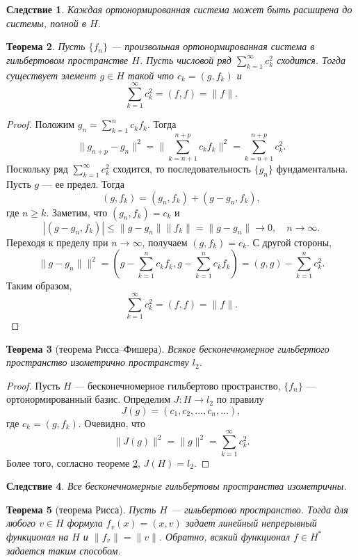 \documentclass[12pt, titlepage, oneside]{amsbook}
\newtheorem{theorem}{Теорема}[chapter]
\newtheorem{corollary}[theorem]{Следствие}
\theoremstyle{definition}
\theoremstyle{remark}
\begin{document}
\begin{corollary}
	\label{Hil4}
	Каждая ортонормированная система может быть расширена до системы, полной в $H$.
\end{corollary}

\begin{theorem}
	\label{Hil5}
	Пусть $\{f_n\}$ --- произвольная ортонормированная система в гильбертовом пространстве $H$. Пусть числовой ряд $\sum\limits_{k=1}^{\infty}c^2_k$ сходится. Тогда существует элемент $g\in H$ такой что $c_k=(g,f_k)$ и $$\sum\limits_{k=1}^{\infty}c^2_k=(f,f)=\|f\|.$$
\end{theorem}

\begin{proof}
	Положим $g_n=\sum\limits_{k=1}^{n}c_k f_k$. Тогда $$\|g_{n+p}-g_{n}\|^2=\|\sum\limits_{k=n+1}^{n+p}c_k f_k\|^2=\sum\limits_{k=n+1}^{n+p}c^2_k.$$ Поскольку ряд $\sum\limits_{k=1}^{\infty}c^2_k$ сходится, то последовательность $\{g_n\}$ фундаментальна. Пусть $g$ --- ее предел. Тогда $$(g,f_k)=(g_n,f_k)+(g-g_n,f_k),$$ где $n\geq k$. Заметим, что $(g_n,f_k)=c_k$ и $$|(g-g_n,f_k)|\leq\|g-g_n\|\|f_k\|=\|g-g_n\|\rightarrow 0,\quad n\rightarrow\infty.$$ Переходя к пределу при $n\rightarrow\infty$, получаем $(g,f_k)=c_k$. С другой стороны, $$\|g-g_n\|\|^2=\left(g-\sum\limits_{k=1}^{n}c_k f_k,g-\sum\limits_{k=1}^{n}c_k f_k\right)=(g,g)-\sum\limits_{k=1}^{n}c^2_k.$$ Таким образом, $$\sum\limits_{k=1}^{\infty}c^2_k=(f,f)=\|f\|.$$
\end{proof}

\begin{theorem}[теорема Рисса--Фишера]
	\label{RisFish}
	Всякое бесконечномерное гильбертого пространство изометрично пространству $l_2$.
\end{theorem}

\begin{proof}
	Пусть $H$ --- бесконечномерное гильбертово пространство, $\{f_n\}$ --- ортонормированный базис. Определим $J\colon H\rightarrow l_2$ по правилу $$J(g)=(c_1,c_2,\ldots,c_n,\ldots),$$ где $c_k=(g,f_k)$. Очевидно, что $$\|J(g)\|^2=\|g\|^2=\sum\limits_{k=1}^{\infty}c_k^2.$$ Более того, согласно теореме \ref{Hil5}, $J(H)=l_2$.
\end{proof}

\begin{corollary}
	\label{RisFish2}
	Все бесконечномерные гильбертовы пространства изометричны.
\end{corollary}

\begin{theorem}[теорема Рисса]
	\label{RisHil}
	Пусть $H$ --- гильбертово пространство. Тогда для любого $v\in H$ формула $f_v(x)=(x,v)$ задает линейный непрерывный функционал на $H$ и $\|f_v\|=\|v\|$. Обратно, всякий функционал $f\in H^*$ задается таким способом.
\end{theorem}
\end{document}
